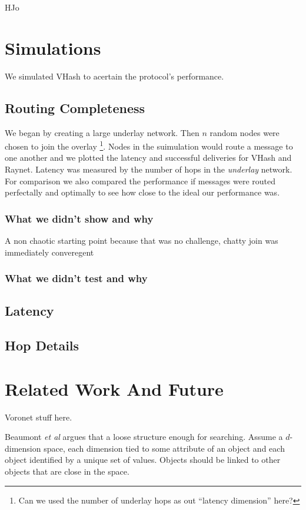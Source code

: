 \documentclass{IEEEtran}
\begin{document}
HJo
\section{Simulations}
We simulated VHash to acertain the protocol's performance. 


\subsection{Routing Completeness}

We began by creating a large underlay network.  Then $n$ random nodes were chosen to join the overlay \footnote{Can we used the number of underlay hops as out ``latency dimension'' here? }.  Nodes in the suimulation would route a message to one another and we plotted the latency and successful deliveries for VHash and Raynet.  Latency was measured by the number of hops in the \textit{underlay} network.  For comparison we also compared the performance if messages were routed perfectally and optimally to see how close to the ideal our performance was. 


\subsubsection*{What we didn't show and why}
A non chaotic starting point because that was no challenge, chatty join was immediately converegent

\subsubsection*{What we didn't test and why}

\subsection{Latency}

\subsection{Hop Details}


\section{Related Work And Future}
Voronet stuff here.


Beaumont \textit{et al} \cite{raynet}  argues that a loose structure enough for searching.  Assume a $d$-dimension space, each dimension tied to some attribute of an object and each object identified by a unique set of values.  Objects should be linked to other objects that are close in the space.
 
\end{document}
